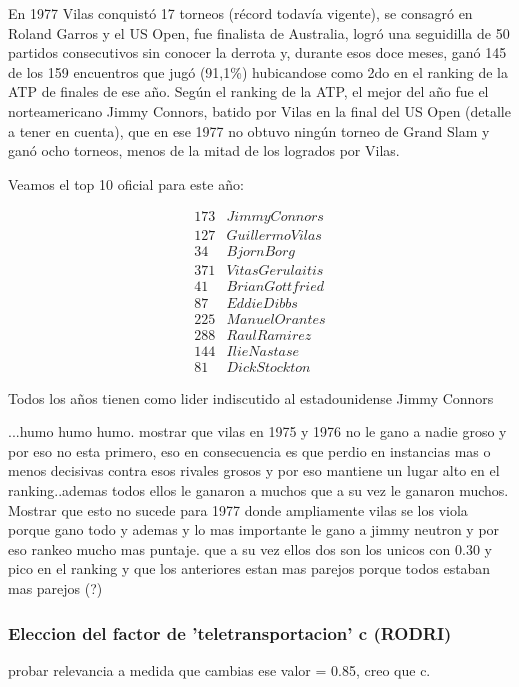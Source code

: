 En 1977 Vilas conquistó 17 torneos (récord todavía vigente), se consagró en Roland Garros y el US Open, fue finalista de Australia, logró una seguidilla de 50 partidos consecutivos sin conocer la derrota y, durante esos doce meses, ganó 145 de los 159 encuentros que jugó (91,1\%) hubicandose como 2do en el ranking de la ATP de finales de ese año.
Según el ranking de la ATP, el mejor del año fue el norteamericano Jimmy Connors, batido por Vilas en la final del US Open (detalle a tener en cuenta), que en ese 1977 no obtuvo ningún torneo de Grand Slam y ganó ocho torneos, menos de la mitad de los logrados por Vilas.  


Veamos el top 10 oficial para este año:

\begin{eqnarray*}
173 & Jimmy Connors \\
127 & Guillermo Vilas \\
34 & Bjorn Borg \\
371 & Vitas Gerulaitis \\
41 & Brian Gottfried \\
87 & Eddie Dibbs \\
225 & Manuel Orantes \\
288 & Raul Ramirez \\
144 & Ilie Nastase \\
81 & Dick Stockton 
\end{eqnarray*}

Todos los años tienen como lider indiscutido al estadounidense Jimmy Connors


...humo humo humo. mostrar que vilas en 1975 y 1976 no le gano a nadie groso y por eso no esta primero, eso en consecuencia es que perdio en instancias mas o menos decisivas contra esos rivales grosos y por eso mantiene un lugar alto en el ranking..ademas todos ellos le ganaron a muchos que a su vez le ganaron muchos. 
Mostrar que esto no sucede para 1977 donde ampliamente vilas se los viola porque gano todo y ademas y lo mas importante le gano a jimmy neutron y por eso rankeo mucho mas puntaje. que a su vez ellos dos son los unicos con 0.30 y pico en el ranking y que los anteriores estan mas parejos porque todos estaban mas parejos (?) 

\subsubsection{Eleccion del factor de 'teletransportacion' c (RODRI)}
probar relevancia a medida que cambias ese valor = 0.85, creo que c.

